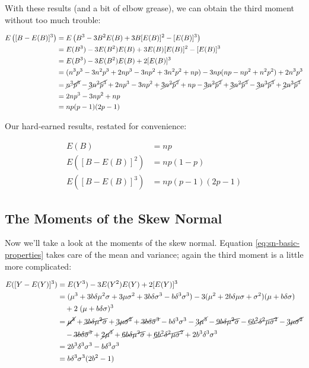 \documentclass{article}
\begin{document}
With these results (and a bit of elbow grease), we can obtain the third moment
without too much trouble:

\begin{align*}
  E \left( [B - E(B)]^3 \right) &= E \left( B^3 - 3B^2 E(B) + 3B [E(B)]^2 - [E(B)]^3 \right) \\
  &= E(B^3) - 3 E(B^2) E(B) + 3 E(B) [E(B)]^2 - [E(B)]^3 \\
  &= E(B^3) - 3 E(B^2) E(B) + 2 [E(B)]^3 \\
  &= (n^3p^3 - 3n^2p^3 + 2np^3 - 3np^2 + 3n^2p^2 + np) - 3np(np - np^2 + n^2p^2) + 2n^3p^3 \\
  &= \cancel{n^3p^3} - \cancel{3n^2p^3} + 2np^3 - 3np^2 + \cancel{3n^2p^2} + np - \cancel{3n^2p^2} + \cancel{3n^2p^3} - \cancel{3n^3p^3} + \cancel{2n^3p^3} \\
  &= 2np^3 - 3np^2 + np \\
  &= np(p-1)(2p-1)
\end{align*}

Our hard-earned results, restated for convenience:

\begin{align}
  E(B) &= np \nonumber \\
  E([B - E(B)]^2) &= np(1-p) \\
  E([B - E(B)]^3) &= np(p-1)(2p-1) \nonumber
\end{align}

\subsection{The Moments of the Skew Normal}

Now we'll take a look at the moments of the skew normal. Equation
\eqref{eq:sn-basic-properties} takes care of the mean and variance; again the
third moment is a little more complicated:

\begin{align*}
  E([Y - E(Y)]^3) &= E(Y^3) - 3E(Y^2)E(Y) + 2[E(Y)]^3 \\
  &= (\mu^3 + 3 b \delta \mu^2 \sigma + 3 \mu \sigma^2 + 3 b \delta \sigma^3 - b \delta^3 \sigma^3) - 3 (\mu^2 + 2b \delta \mu \sigma + \sigma^2) (\mu + b \delta \sigma) \\
  & \quad + 2\;(\mu + b \delta \sigma)^3 \\
  &= \cancel{\mu^3} + \cancel{3 b \delta \mu^2 \sigma} + \cancel{3 \mu \sigma^2} + \cancel{3 b \delta \sigma^3} - b \delta^3 \sigma^3 - \cancel{3 \mu^3} - \cancel{9 b \delta \mu^2 \sigma} -
    \cancel{6 b^2 \delta^2 \mu \sigma^2} - \cancel{3 \mu \sigma^2} \\
  & \quad - \cancel{3 b \delta \sigma^3} + \cancel{2 \mu^3} + \cancel{6 b \delta \mu^2 \sigma} + \cancel{6 b^2 \delta^2 \mu \sigma^2} + 2 b^3 \delta^3 \sigma^3 \\
  &= 2 b^3 \delta^3 \sigma^3 - b \delta^3 \sigma^3 \\
  &= b \delta^3 \sigma^3 (2b^2 - 1)
\end{align*}
\end{document}

